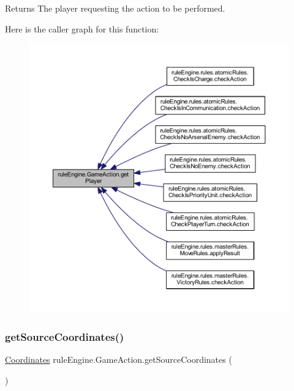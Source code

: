 \begin{DoxyReturn}{Returns}
The player requesting the action to be performed. 
\end{DoxyReturn}
Here is the caller graph for this function\+:
\nopagebreak
\begin{figure}[H]
\begin{center}
\leavevmode
\includegraphics[width=350pt]{classrule_engine_1_1_game_action_acd7a1a123d274d486d2696ef56df0f01_icgraph}
\end{center}
\end{figure}
\mbox{\label{classrule_engine_1_1_game_action_a27182b152911857a0f87e4977e2246f1}} 
\subsubsection{\texorpdfstring{get\+Source\+Coordinates()}{getSourceCoordinates()}}
{\footnotesize\ttfamily \mbox{\hyperlink{classrule_engine_1_1_coordinates}{Coordinates}} rule\+Engine.\+Game\+Action.\+get\+Source\+Coordinates (\begin{DoxyParamCaption}{ }\end{DoxyParamCaption})\hspace{0.3cm}{\ttfamily [inline]}}


